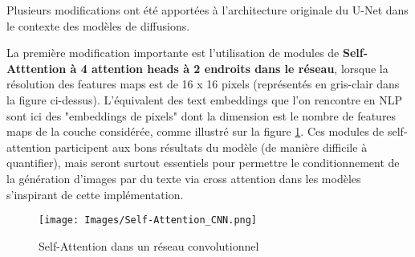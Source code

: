 \documentclass{article}
\begin{document}
Plusieurs modifications ont été apportées à l'architecture originale du U-Net dans le contexte des modèles de diffusions. \par
\begin{minipage}{.60\textwidth}
    \setlength{\parindent}{1.5em}
    La première modification importante est l'utilisation de modules de \textbf{Self-Atttention à 4 attention heads à 2 endroits dans le réseau}, lorsque la résolution des features maps est de 16 x 16 pixels (représentés en gris-clair dans la figure ci-dessus). L'équivalent des text embeddings que l'on rencontre en NLP sont ici des "embeddings de pixels" dont la dimension est le nombre de features maps de la couche considérée, comme illustré sur la figure \ref{SA-CNN}. Ces modules de self-attention participent aux bons résultats du modèle (de manière difficile à quantifier), mais seront surtout essentiels pour permettre le conditionnement de la génération d'images par du texte via cross attention dans les modèles s'inspirant de cette implémentation.
\end{minipage}
\begin{minipage}{.01\textwidth}
    \text{\hfill}
\end{minipage}
\begin{minipage}{.4\textwidth}
    \vspace{-0.5cm}
    \begin{figure}[H]
        \centering
        \texttt{[image: Images/Self-Attention\_CNN.png]}
        \caption{Self-Attention dans un réseau convolutionnel \cite{self-attention-cnn}}
        \label{SA-CNN}
    \end{figure}
\end{minipage}
\end{document}
